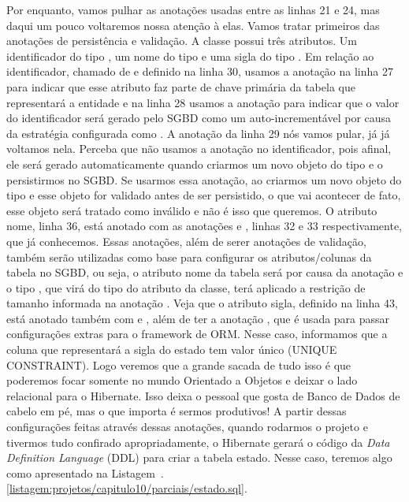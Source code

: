 Por enquanto, vamos pulhar as anotações usadas entre as linhas 21 e 24, mas daqui um pouco voltaremos nossa atenção à elas. Vamos tratar primeiros das anotações de persistência e validação. A classe  possui três atributos. Um identificador do tipo , um nome do tipo  e uma sigla do tipo . Em relação ao identificador, chamado de  e definido na linha 30, usamos a anotação  na linha 27 para indicar que esse atributo faz parte de chave primária da tabela que representará a entidade  e na linha 28 usamos a anotação  para indicar que o valor do identificador será gerado pelo SGBD como um auto-incrementável por causa da estratégia configurada como . A anotação da linha 29 nós vamos pular, já já voltamos nela. Perceba que não usamos a anotação  no identificador, pois afinal, ele será gerado automaticamente quando criarmos um novo objeto do tipo  e o persistirmos no SGBD. Se usarmos essa anotação, ao criarmos um novo objeto do tipo  e esse objeto for validado antes de ser persistido, o que vai acontecer de fato, esse objeto será tratado como inválido e não é isso que queremos. O atributo nome, linha 36, está anotado com as anotações  e , linhas 32 e 33 respectivamente, que já conhecemos. Essas anotações, além de serer anotações de validação, também serão utilizadas como base para configurar os atributos/colunas da tabela no SGBD, ou seja, o atributo nome da tabela será  por causa da anotação  e o tipo , que virá do tipo  do atributo da classe, terá aplicado a restrição de tamanho informada na anotação . Veja que o atributo sigla, definido na linha 43, está anotado também com  e , além de ter a anotação , que é usada para passar configurações extras para o framework de ORM. Nesse caso, informamos que a coluna que representará a sigla do estado tem valor único (UNIQUE CONSTRAINT). Logo veremos que a grande sacada de tudo isso é que poderemos focar somente no mundo Orientado a Objetos e deixar o lado relacional para o Hibernate. Isso deixa o pessoal que gosta de Banco de Dados de cabelo em pé, mas o que importa é sermos produtivos! A partir dessas configurações feitas através dessas anotações, quando rodarmos o projeto e tivermos tudo confirado apropriadamente, o Hibernate gerará o código da \textit{Data Definition Language} (DDL) para criar a tabela estado. Nesse caso, teremos algo como apresentado na Listagem~\thechapter.\ref{listagem:projetos/capitulo10/parciais/estado.sql}.

